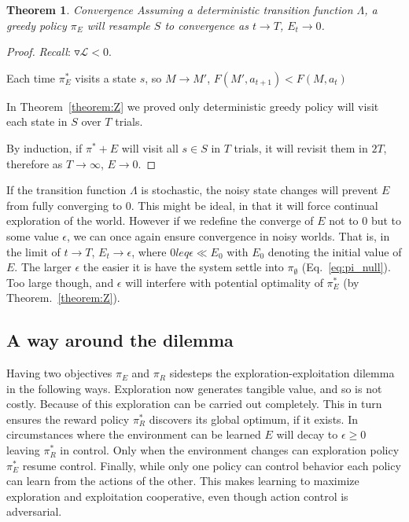\documentclass[9pt,twocolumn,twoside]{pnas-new}
\newtheorem{theorem}{Theorem}
\begin{document}
\begin{theorem}{Convergence}
    Assuming a deterministic transition function $\Lambda$, a greedy policy $\pi_E$ will resample $S$ to convergence as $t \rightarrow T$, $E_t \rightarrow 0$.
\end{theorem}
\begin{proof}
    \textit{Recall}: $\triangledown \mathcal{L} < 0$. 

    Each time $\pi^*_E$ visits a state $s$, so $M \rightarrow M'$, $F(M', a_{t+1}) < F(M, a_t)$

    In Theorem~\ref{theorem:Z} we proved only deterministic greedy policy will visit each state in $S$ over $T$ trials.
    
    By induction, if $\pi^*+E$ will visit all $s \in S$ in $T$ trials, it will revisit them in $2T$, therefore as $T \rightarrow \infty$, $E \rightarrow 0$. 
\end{proof}

If the transition function $\Lambda$ is stochastic, the noisy state changes will prevent $E$ from fully converging to 0. This might be ideal, in that it will force continual exploration of the world. However if we redefine the converge of $E$ not to 0 but to some value $\epsilon$, we can once again ensure convergence in noisy worlds. That is, in the limit of $t \rightarrow T$, $E_t \rightarrow \epsilon$, where $0 leq \epsilon \ll E_0$ with $E_0$ denoting the initial value of $E$. The larger $\epsilon$ the easier it is have the system settle into $\pi_{\emptyset}$ (Eq.~\ref{eq:pi_null}). Too large though, and $\epsilon$ will interfere with potential optimality of $\pi^*_E$ (by Theorem.~\ref{theorem:Z}). 




\subsection*{A way around the dilemma}
Having two objectives $\pi_E$ and $\pi_R$ sidesteps the exploration-exploitation dilemma in the following ways. Exploration now generates tangible value, and so is not costly. Because of this exploration can be carried out completely. This in turn ensures the reward policy $\pi^*_R$ discovers its global optimum, if it exists. In circumstances where the environment can be learned $E$ will decay to $\epsilon \geq 0$ leaving $\pi^*_R$ in control. Only when the environment changes can exploration policy $\pi^*_E$ resume control. Finally, while only one policy can control behavior each policy can learn from the actions of the other. This makes learning to maximize exploration and exploitation cooperative, even though action control is adversarial. 
\end{document}
